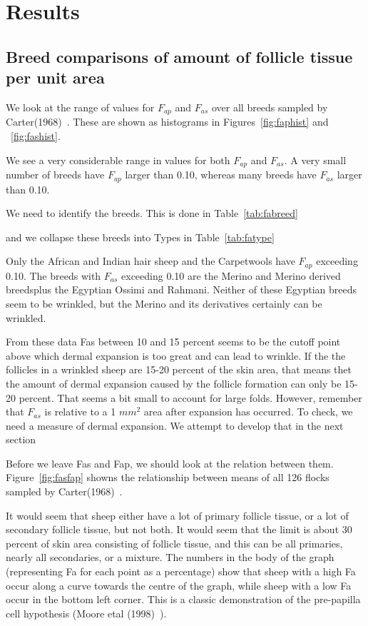 \documentclass[titlepage]{article}  %
\begin{document}
\section{Results}
\subsection{Breed comparisons of amount of follicle tissue per unit area}

We look at the range of values for $F_{ap}$ and $F_{as}$ over all breeds sampled by Carter(1968)~\cite{cart:68}. These are shown as histograms in Figures~\ref{fig:faphist} and ~\ref{fig:fashist}.


We see a very considerable range in values for both $F_{ap}$ and $F_{as}$. A very small number of breeds have $F_{ap}$ larger than 0.10, whereas many breeds have $F_{as}$ larger than 0.10. 

We need to identify the breeds. This is done in Table~\ref{tab:fabreed}

and we collapse these breeds into Types in Table~\ref{tab:fatype}

Only the African and Indian hair sheep and the Carpetwools have $F_{ap}$ exceeding 0.10. 
The breeds with $F_{as}$ exceeding 0.10 are the Merino and Merino derived breedsplus the Egyptian  Ossimi and Rahmani. Neither of these Egyptian breeds seem to be wrinkled, but the Merino and its derivatives certainly can be wrinkled.

From these data Fas between 10 and 15 percent seems to be the cutoff point above which dermal expansion is too great and can lead to wrinkle. If the the follicles in a wrinkled sheep are 15-20 percent of the skin area, that means thet the amount of dermal expansion caused by the follicle formation can only be 15-20 percent. That seems a bit small to account for large folds. However, remember that $F_{as}$ is relative to a 1 $mm^{2}$ area after expansion has occurred. To check, we need a measure of dermal expansion. We attempt to develop that in the next section

Before we leave Fas and Fap, we should look at the relation between them. Figure~\ref{fig:fasfap} showns the relationship between means of all 126 flocks sampled by Carter(1968)~\cite{cart:68}.

 It would seem that sheep either have a lot of primary follicle tissue, or a lot of secondary follicle tissue, but not both. It would seem that the limit is about 30 percent of skin area consisting of follicle tissue, and this can be all primaries, nearly all secondaries, or a mixture.  The numbers in the body of the graph (representing Fa for each point as a percentage) show that sheep with a high Fa occur along a curve towards the centre of the graph, while sheep with a low Fa occur in the bottom left corner.  This is a classic demonstration of the pre-papilla cell hypothesis (Moore etal (1998)~\cite{moor:98}). 
\end{document}
